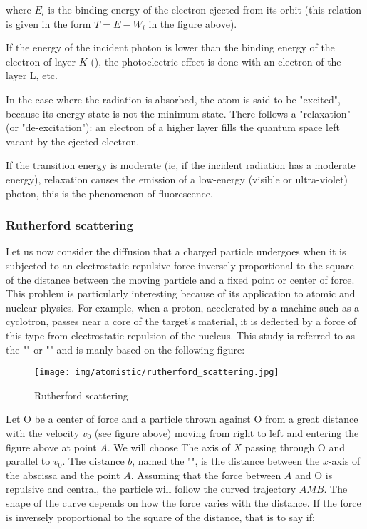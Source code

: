 	where $E_l$ is the binding energy of the electron ejected from its orbit (this relation is given in the form $T=E-W_i$ in the figure above).
	
	If the energy of the incident photon is lower than the binding energy of the electron of layer $K$ (), the photoelectric effect is done with an electron of the layer L, etc.

In the case where the radiation is absorbed, the atom is said to be "excited", because its energy state is not the minimum state. There follows a "relaxation" (or "de-excitation"): an electron of a higher layer fills the quantum space left vacant by the ejected electron.

	If the transition energy is moderate (ie, if the incident radiation has a moderate energy), relaxation causes the emission of a low-energy (visible or ultra-violet) photon, this is the phenomenon of fluorescence. 
	
	\pagebreak
	\subsubsection{Rutherford scattering}\label{rutherford scattering}
	Let us now consider the diffusion that a charged particle undergoes when it is subjected to an electrostatic repulsive force inversely proportional to the square of the distance between the moving particle and a fixed point or center of force. This problem is particularly interesting because of its application to atomic and nuclear physics. For example, when a proton, accelerated by a machine such as a cyclotron, passes near a core of the target's material, it is deflected by a force of this type from electrostatic repulsion of the nucleus. This study is referred to as the "" or "" and is manly based on the following figure:
	\begin{figure}[H]
		\centering
		\texttt{[image: img/atomistic/rutherford\_scattering.jpg]}
		\caption{Rutherford scattering}
	\end{figure}
	Let O be a center of force and a particle thrown against O from a great distance with the velocity $v_0$ (see figure above) moving from right to left and entering the figure above at point $A$. We will choose The axis of $X$ passing through O and parallel to $v_0$. The distance $b$, named the "", is the distance between the $x$-axis of the abscissa and the point $A$. Assuming that the force between $A$ and O is repulsive and central, the particle will follow the curved trajectory $AMB$. The shape of the curve depends on how the force varies with the distance. If the force is inversely proportional to the square of the distance, that is to say if:
	
